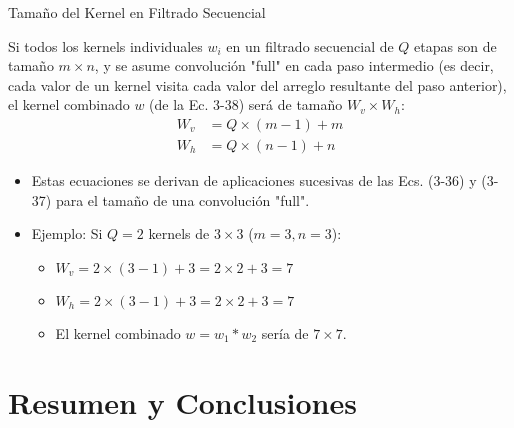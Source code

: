 \documentclass[10pt]{beamer}
\newcommand{\eqnum}[1]{\tag{#1}} %
\begin{document}
\begin{frame}[fragile]{Tamaño del Kernel en Filtrado Secuencial}
{\footnotesize
Si todos los kernels individuales $w_i$ en un filtrado secuencial de $Q$ etapas son de tamaño $m \times n$, y se asume convolución "full" en cada paso intermedio (es decir, cada valor de un kernel visita cada valor del arreglo resultante del paso anterior), el kernel combinado $w$ (de la Ec. 3-38) será de tamaño $W_v \times W_h$:
\begin{align}
W_v &= Q \times (m-1) + m \eqnum{3-39} \\
W_h &= Q \times (n-1) + n \eqnum{3-40}
\end{align}
\vspace{0.1cm}
\begin{itemize}
\item Estas ecuaciones se derivan de aplicaciones sucesivas de las Ecs. (3-36) y (3-37) para el tamaño de una convolución "full".
\item Ejemplo: Si $Q=2$ kernels de $3 \times 3$ ($m=3, n=3$):
\begin{itemize}
\item $W_v = 2 \times (3-1) + 3 = 2 \times 2 + 3 = 7$
\item $W_h = 2 \times (3-1) + 3 = 2 \times 2 + 3 = 7$
\item El kernel combinado $w = w_1 * w_2$ sería de $7 \times 7$.
\end{itemize}
\end{itemize}
}
\end{frame}

\section{Resumen y Conclusiones}
\end{document}
